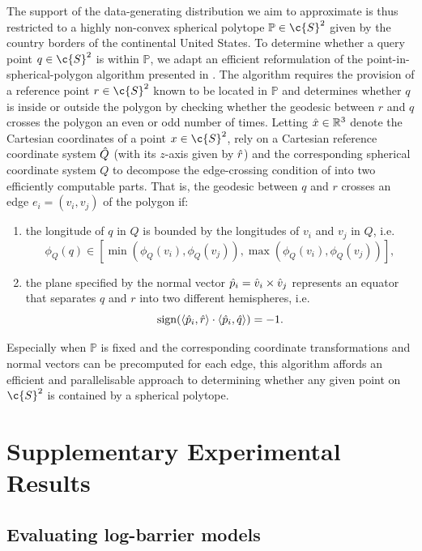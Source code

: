 The support of the data-generating distribution we aim to approximate is thus restricted to a highly non-convex spherical polytope $\mathbb{P}\in\c{S}^2$ given by the country borders of the continental United States.
To determine whether a query point $q\in\c{S}^2$ is within $\mathbb{P}$, we adapt an efficient reformulation of the point-in-spherical-polygon algorithm \parencite{bevis1989locating} presented in \cite{ketzner2022robust}.
The algorithm requires the provision of a reference point $r\in\c{S}^2$ known to be located in $\mathbb{P}$ and determines whether $q$ is inside or outside the polygon by checking whether the geodesic between $r$ and $q$ crosses the polygon an even or odd number of times.
Letting $\Hat{x}\in\mathbb{R}^3$ denote the Cartesian coordinates of a point $x\in\c{S}^2$, \cite{ketzner2022robust} rely on a Cartesian reference coordinate system $\Hat{Q}$ (with its $z$-axis given by $\Hat{r}$) and the corresponding spherical coordinate system $Q$ to decompose the edge-crossing condition of \textcite{bevis1989locating} into two efficiently computable parts.
That is, the geodesic between $q$ and $r$ crosses an edge $e_i=(v_i, v_j)$ of the polygon if: \begin{enumerate}[label=(\roman*)] \item the longitude of $q$ in $Q$ is bounded by the longitudes of $v_i$ and $v_j$ in $Q$, i.e. $$ \phi_{Q}(q)\in[\min(\phi_{Q}(v_i), \phi_{Q}(v_j)), \max(\phi_{Q}(v_i), \phi_{Q}(v_j))], $$ \item the plane specified by the normal vector $\Hat{p}_i=\Hat{v}_i\times \Hat{v}_j$ represents an equator that separates ${q}$ and ${r}$ into two different hemispheres, i.e. $$ \operatorname{sign}(\langle \Hat{p}_i, \Hat{r} \rangle \cdot \langle \Hat{p}_i, \Hat{q} \rangle) = -1.
	      $$
\end{enumerate}

Especially when $\mathbb{P}$ is fixed and the corresponding coordinate transformations and normal vectors can be precomputed for each edge, this algorithm affords an efficient and parallelisable approach to determining whether any given point on $\c{S}^2$ is contained by a spherical polytope.

\section{Supplementary Experimental Results}
\label{sec:experimental_appendix}

\subsection{Evaluating log-barrier models}
\label{sec:app_exp_barrier_results}

